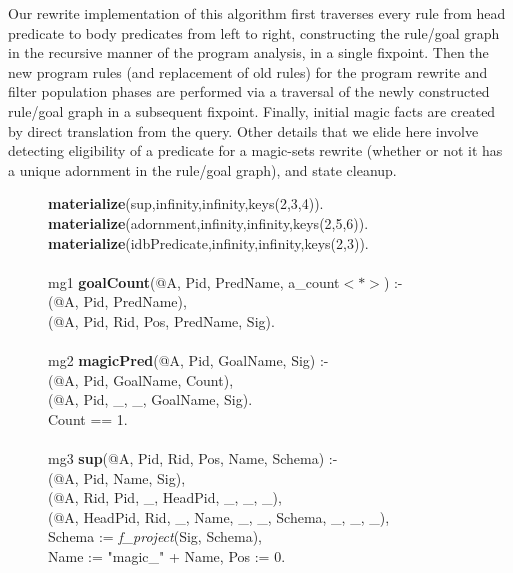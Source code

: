 {Our rewrite implementation of this algorithm first traverses every rule from
head predicate to body predicates from left to right, constructing the
rule/goal graph in the recursive manner of the program analysis, in a single
fixpoint.  Then the new program rules (and replacement of old rules) for the
program rewrite and filter population phases are performed via a traversal of
the newly constructed rule/goal graph in a subsequent fixpoint.  Finally,
initial magic facts are created by direct translation from the query.  Other
details that we elide here involve detecting eligibility of a predicate for a
magic-sets rewrite (whether or not it has a unique adornment in the rule/goal
graph), and state cleanup.

\begin{figure}
\ssp
\begin{boxedminipage}{\linewidth}
{\bf materialize}(sup,infinity,infinity,keys(2,3,4)). \\
{\bf materialize}(adornment,infinity,infinity,keys(2,5,6)). \\
{\bf materialize}(idbPredicate,infinity,infinity,keys(2,3)). \\
\\
mg1 {\bf goalCount}(@A, Pid, PredName, a\_count$<*>$) :- \\
(@A, Pid, PredName), \\
(@A, Pid, Rid, Pos, PredName, Sig). \\
\\
mg2 {\bf magicPred}(@A, Pid, GoalName, Sig) :- \\
(@A, Pid, GoalName, Count), \\
(@A, Pid, \_, \_, GoalName, Sig). \\
\datalogspace Count == 1. \\
\\
mg3 {\bf sup}(@A, Pid, Rid, Pos, Name, Schema) :- \\
(@A, Pid, Name, Sig), \\
(@A, Rid, Pid, \_, HeadPid, \_, \_, \_), \\
(@A, HeadPid, Rid, \_, Name, \_, \_, Schema, \_, \_, \_), \\
\datalogspace Schema := {\em f\_project}(Sig, Schema), \\
\datalogspace Name := "magic\_" + Name, Pos := 0. \\

\end{boxedminipage}
\end{figure}}
